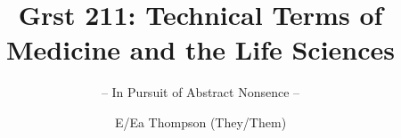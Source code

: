 \documentclass[graybox,envcountchap,sectrefs]{style/svmono}
\begin{document}
\author{E/Ea Thompson (They/Them)}
\title{Grst 211: Technical Terms of Medicine and the Life Sciences}
\subtitle{-- In Pursuit of Abstract Nonsence --}
\maketitle

\frontmatter%

% 
% 

% 

\tableofcontents




\mainmatter%
%



























\backmatter%
% 
% 
% 
\printindex

\end{document}
